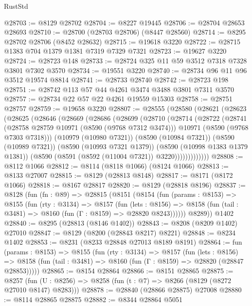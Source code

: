 \begin{lexlean}{RustStd}
\begin{coremodule}
@28703 := @8129 @28702
@28704 := @8227 @19445
@28706 := @28704 @28653 @28693
@28710 := @28700 (@28703 @28706) (@8447 @28560)
@28714 := @8295 @28702 @28706 (@8452 @28632)
@28715 := @19618 @3220
@28722 := @28715 @1383 @704 @1379 @1381 @7319 @7329 @7321
@28723 := @19627 @3220
@28724 := @28723 @148
@28733 := @28724 @325 @11 @59 @3512 @7318 @7328 @3801 @7302 @3570
@28734 := @19551 @3220
@28740 := @28734 @96 @11 @96 @3512 @19574 @8814
@28741 := @28733 @28740
@28742 := @28723 @198
@28751 := @28742 @113 @57 @44 @4261 @3474 @3488 @3801 @7311 @3570
@28757 := @28734 @22 @57 @22 @4261 @19559 @15303
@28758 := @28751 @28757
@28759 := @19658 @3220
@28807 := @28555
    (@28580
      (@28621
        (@28623
          (@28625
            (@28646
              (@28669
                (@28686
                  (@28699
                    (@28710
                      (@28714
                        (@28722
                          (@28741
                            (@28758 @28759 @10971 (@8590 (@9768 @7312 @3474)))
                            @10971
                            (@8590 (@9768 @7303 @7318)))
                          (@10979 (@10980 @7321))
                          (@8590 (@10984 @7321))
                          (@8590 (@10989 @7321))
                          (@8590 (@10993 @7321 @1379))
                          (@8590 (@10998 @1383 @1379 @1381))
                          (@8590 (@8591 (@8592 (@11004 @7321)) @3220)))))))))))))
@28808 := @8112 @1066
@28812 := @8114 (@8118 @1066) (@8124 @1066)
@28813 := @8133 @27007
@28815 := @8129 (@28813 @8148)
@28817 := @8171 (@8172 @1066)
@28818 := @8167 @28817
@28820 := @8129 (@28818 @8196)
@28837 := @8128
    (fun (fn : @89) =>
    @28815
      (@8151
        (@8154
          (fun (params : @8153) =>
          @8155
            (fun (rty : @3134) =>
            @8157
              (fun (lets : @8156) =>
              @8158 (fun (tail : @3481) => @8160 (fun (Γ : @8159) => @28820 @8243))))))
        @8289))
    @1402
@28840 := @8295 (@28813 (@8146 @1402))
@28843 := @8208 (@8209 @1402) @27010
@28847 := @8129 (@8200 (@28843 @8217) @8221)
@28848 := @8234 @1402
@28853 := @8231 (@8233 @28848 @27013 @8189 @8191)
@28864 := fun (params : @8153) =>
  @8155
    (fun (rty : @3134) =>
    @8157
      (fun (lets : @8156) =>
      @8158 (fun (tail : @3481) => @8160 (fun (Γ : @8159) => @28820 (@28847 @28853)))))
@28865 := @8154 @28864
@28866 := @8151 @28865
@28875 := @8257
    (fun (U : @8256) => @8258 (fun (t : @7) => @8266 (@8129 (@8272 @27010 @8147) @8283)))
@28878 := @28840 (@28866 @28875) @27008
@28880 := @8114 @28865 @28875
@28882 := @8344 @28864 @5051

\end{coremodule}
\end{lexlean}

